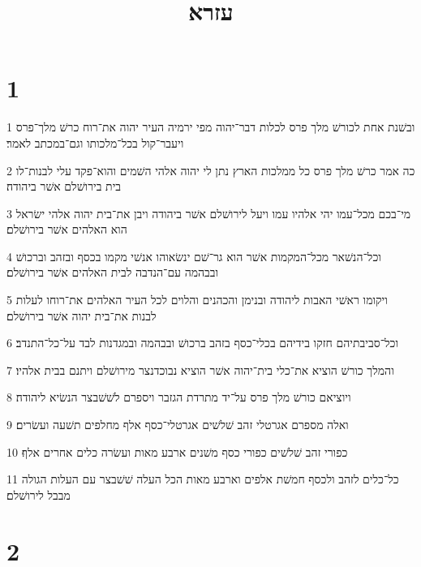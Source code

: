 

\title{עזרא}


\chapter{1}

\par 1 ובשׁנת אחת לכורשׁ מלך פרס לכלות דבר־יהוה מפי ירמיה העיר יהוה את־רוח כרשׁ מלך־פרס ויעבר־קול בכל־מלכותו וגם־במכתב לאמר׃
\par 2 כה אמר כרשׁ מלך פרס כל ממלכות הארץ נתן לי יהוה אלהי השׁמים והוא־פקד עלי לבנות־לו בית בירושׁלם אשׁר ביהודה׃
\par 3 מי־בכם מכל־עמו יהי אלהיו עמו ויעל לירושׁלם אשׁר ביהודה ויבן את־בית יהוה אלהי ישׂראל הוא האלהים אשׁר בירושׁלם׃
\par 4 וכל־הנשׁאר מכל־המקמות אשׁר הוא גר־שׁם ינשׂאוהו אנשׁי מקמו בכסף ובזהב וברכושׁ ובבהמה עם־הנדבה לבית האלהים אשׁר בירושׁלם׃
\par 5 ויקומו ראשׁי האבות ליהודה ובנימן והכהנים והלוים לכל העיר האלהים את־רוחו לעלות לבנות את־בית יהוה אשׁר בירושׁלם׃
\par 6 וכל־סביבתיהם חזקו בידיהם בכלי־כסף בזהב ברכושׁ ובבהמה ובמגדנות לבד על־כל־התנדב׃
\par 7 והמלך כורשׁ הוציא את־כלי בית־יהוה אשׁר הוציא נבוכדנצר מירושׁלם ויתנם בבית אלהיו׃
\par 8 ויוציאם כורשׁ מלך פרס על־יד מתרדת הגזבר ויספרם לשׁשׁבצר הנשׂיא ליהודה׃
\par 9 ואלה מספרם אגרטלי זהב שׁלשׁים אגרטלי־כסף אלף מחלפים תשׁעה ועשׂרים׃
\par 10 כפורי זהב שׁלשׁים כפורי כסף משׁנים ארבע מאות ועשׂרה כלים אחרים אלף׃
\par 11 כל־כלים לזהב ולכסף חמשׁת אלפים וארבע מאות הכל העלה שׁשׁבצר עם העלות הגולה מבבל לירושׁלם׃

\chapter{2}

